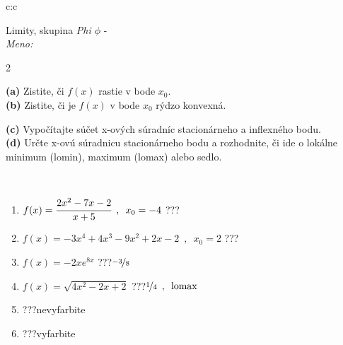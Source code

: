 \documentclass[10pt]{report}
\begin{document}
\begin{tabular}{c:c}
\begin{minipage}[c][104.5mm][t]{0.5\linewidth}
\begin{center}
\vspace{7mm}
{\huge Limity, skupina \textit{Phi $\phi$} -}\\[5mm]
\textit{Meno:}\phantom{xxxxxxxxxxxxxxxxxxxxxxxxxxxxxxxxxxxxxxxxxxxxxxxxxxxxxxxxxxxxxxxxx}\\[5mm]
\begin{minipage}{0.95\linewidth}
\begin{center}
{\small \begin{multicols}{2} \raggedright
\textbf{(a)} Zistite, či \(f(x)\) rastie v bode \(x_0\). \\[1mm]
\textbf{(b)} Zistite, či je \(f(x)\) v bode \(x_0\) rýdzo konvexná. \par \columnbreak
\textbf{(c)} Vypočítajte súčet x-ových súradníc stacionárneho a inflexného bodu. \\[1mm]
\textbf{(d)} Určte x-ovú súradnicu stacionárneho bodu a rozhodnite, či ide o lokálne minimum (lomin), maximum (lomax) alebo sedlo. \\[1mm]
\end{multicols}
}
\end{center}
\end{minipage}
\\[4mm]
\begin{minipage}{0.79\linewidth}
\begin{center}
\begin{varwidth}{\linewidth}
\begin{enumerate}
\normalsize
\item $f(x)=\cfrac{2x^2-7x-2}{x+5}\enspace , \enspace x_0=-4$\quad \dotfill\; ???\;\dotfill \quad {}
\item $f(x)=-3x^4+4x^3-9x^2+2x-2\enspace , \enspace x_0=2$\quad \dotfill\; ???\;\dotfill \quad {}
\item $f(x)=-2xe^{8x}$\quad \dotfill\; ???\;\dotfill \quad $\nicefrac{-3}{8}$
\item $f(x)=\sqrt{4x^2-2x+2}$\quad \dotfill\; ???\;\dotfill \quad $\nicefrac{1}{4}\enspace , \enspace\text{lomax}$
\item \quad \dotfill\; ???\;\dotfill \quad nevyfarbite
\item \quad \dotfill\; ???\;\dotfill \quad vyfarbite
\end{enumerate}
\end{varwidth}
\end{center}

\end{minipage}
\end{center}
\end{minipage}
\end{tabular}
\end{document}
